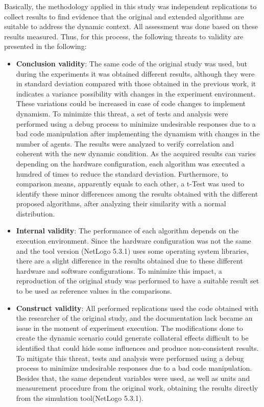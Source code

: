 
Basically, the methodology applied in this study was independent replications to collect results to find evidence that the original and extended algorithms are suitable to address the dynamic context. All assessment was done based on these results measured. Thus, for this process, the following threats to validity are presented in the following: 

\begin{itemize}
   \item \textbf{Conclusion validity}: The same code of the original study was used, but during the experiments it was obtained different results, although they were in standard deviation compared with those obtained in the previous work, it indicates a variance possibility with changes in the experiment environment. These variations could be increased in case of code changes to implement dynamism. To minimize this threat, a set of tests and analysis were performed using a debug process to minimize undesirable responses due to a bad code manipulation after implementing the dynamism with changes in the number of agents. The results were analyzed to verify correlation and coherent with the new dynamic condition. As the acquired results can varies depending on the hardware configuration, each algorithm was executed a hundred of times to reduce the standard deviation. Furthermore, to comparison means, apparently equals to each other, a t-Test was used to identify these minor differences among the results obtained with the different proposed algorithms, after analyzing their similarity with a normal distribution.
   \item \textbf{Internal validity}: The performance of each algorithm depends on the execution environment. Since the hardware configuration was not the same and the tool version (NetLogo 5.3.1) uses some operating system libraries, there are a slight difference in the results obtained due to these different hardware and software configurations. To minimize this impact, a reproduction of the original study \cite{MAS07} was performed to have a suitable result set to be used as reference values in the comparisons.
   \item \textbf{Construct validity}: All performed replications used the code obtained with the researcher of the original study, and the documentation lack became an issue in the moment of experiment execution. The modifications done to create the dynamic scenario could generate collateral effects difficult to be identified that could hide some influences and produce non-consistent results. To mitigate this threat, tests and analysis were performed using a debug process to minimize undesirable responses due to a bad code manipulation. Besides that, the same dependent variables were used, as well as units and measurement procedure from the original work, obtaining the results directly from the simulation tool(NetLogo 5.3.1).

\end{itemize}
